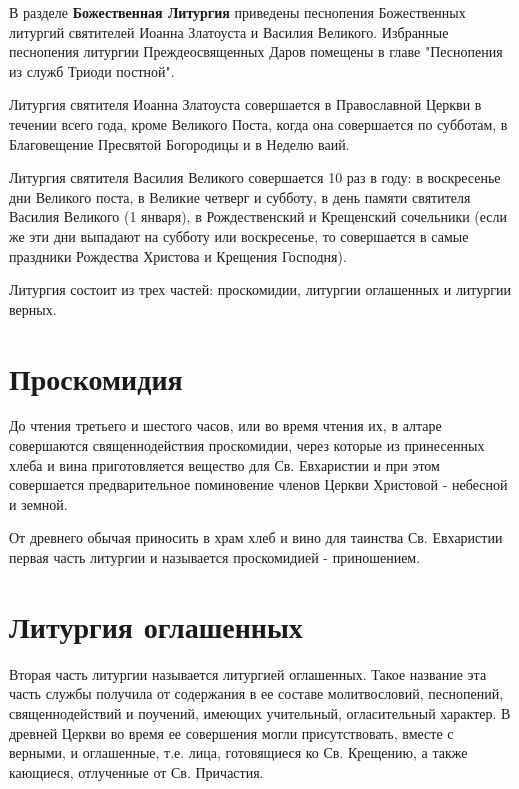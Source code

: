 


В разделе {\bfseries  Божественная Литургия} приведены песнопения Божественных литургий святителей Иоанна Златоуста и Василия Великого. Избранные песнопения литургии Преждеосвященных Даров помещены в главе "Песнопения из служб Триоди постной".

 Литургия святителя Иоанна Златоуста совершается в Православной Церкви в течении всего года, кроме Великого Поста, когда она совершается по субботам, в Благовещение Пресвятой Богородицы и в Неделю ваий.

 Литургия святителя Василия Великого совершается 10 раз в году: в воскресенье дни Великого поста, в Великие четверг и субботу, в день памяти святителя Василия Великого (1 января), в Рождественский и Крещенский сочельники (если же эти дни выпадают на субботу или воскресенье, то совершается в самые праздники Рождества Христова и Крещения Господня).

Литургия состоит из трех частей: проскомидии, литургии оглашенных и литургии верных.  

\section{Проскомидия}

До чтения третьего и шестого часов, или во время чтения их, в алтаре совершаются священнодействия проскомидии, через которые из принесенных хлеба и вина приготовляется вещество для Св. Евхаристии и при этом совершается предварительное поминовение членов Церкви Христовой - небесной и земной.

 От древнего обычая приносить в храм хлеб и вино для таинства Св. Евхаристии первая часть литургии и называется проскомидией - приношением. 

\section{Литургия оглашенных}

Вторая часть литургии называется литургией оглашенных. Такое название эта часть службы получила от содержания в ее составе молитвословий, песнопений, священнодействий и поучений, имеющих учительный, огласительный характер. В древней Церкви во время ее совершения могли присутствовать, вместе с верными, и оглашенные, т.е. лица, готовящиеся ко Св. Крещению, а также кающиеся, отлученные от Св. Причастия.

